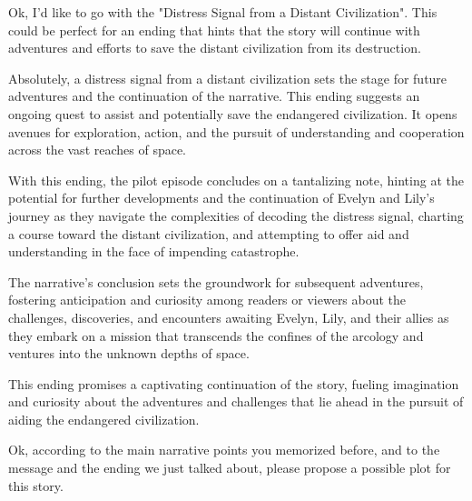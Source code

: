\begin{qquote}
    Ok, I'd like to go with the "Distress Signal from a Distant Civilization". This could be perfect for an ending that hints that the story will continue with adventures and efforts to save the distant civilization from its destruction.
\end{qquote}

\begin{aquote}
    Absolutely, a distress signal from a distant civilization sets the stage for future adventures and the continuation of the narrative. This ending suggests an ongoing quest to assist and potentially save the endangered civilization. It opens avenues for exploration, action, and the pursuit of understanding and cooperation across the vast reaches of space.

    With this ending, the pilot episode concludes on a tantalizing note, hinting at the potential for further developments and the continuation of Evelyn and Lily's journey as they navigate the complexities of decoding the distress signal, charting a course toward the distant civilization, and attempting to offer aid and understanding in the face of impending catastrophe.

    The narrative's conclusion sets the groundwork for subsequent adventures, fostering anticipation and curiosity among readers or viewers about the challenges, discoveries, and encounters awaiting Evelyn, Lily, and their allies as they embark on a mission that transcends the confines of the arcology and ventures into the unknown depths of space.

    This ending promises a captivating continuation of the story, fueling imagination and curiosity about the adventures and challenges that lie ahead in the pursuit of aiding the endangered civilization.
\end{aquote}

\begin{qquote}
    Ok, according to the main narrative points you memorized before, and to the message and the ending we just talked about, please propose a possible plot for this story.
\end{qquote}

